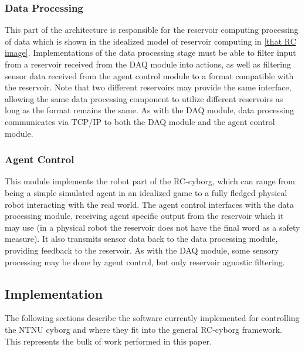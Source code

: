 \subsubsection{Data Processing}
This part of the architecture is responsible for the reservoir computing
processing of data which is shown in the idealized model of reservoir computing in
\ref{that RC image}.
Implementations of the data processing stage must be able to filter input from
a reservoir received from the DAQ module into actions, as well as filtering
sensor data received from the agent control module to a format compatible with
the reservoir.
Note that two different reservoirs may provide the same interface, allowing the
same data processing component to utilize different reservoirs as long as the
format remains the same.
As with the DAQ module, data processing communicates via TCP/IP to both the DAQ
module and the agent control module.
\subsubsection{Agent Control}
This module implements the robot part of the RC-cyborg, which can range from
being a simple simulated agent in an idealized game to a fully fledged physical
robot interacting with the real world.
The agent control interfaces with the data processing module, receiving agent
specific output from the reservoir which it may use (in a physical robot the
reservoir does not have the final word as a safety measure).
It also transmits sensor data back to the data processing module, providing
feedback to the reservoir.
As with the DAQ module, some sensory processing may be done by agent control,
but only reservoir agnostic filtering.
\subsection{Implementation} 
The following sections describe the software currently implemented for
controlling the NTNU cyborg and where they fit into the general RC-cyborg
framework.
This represents the bulk of work performed in this paper.
